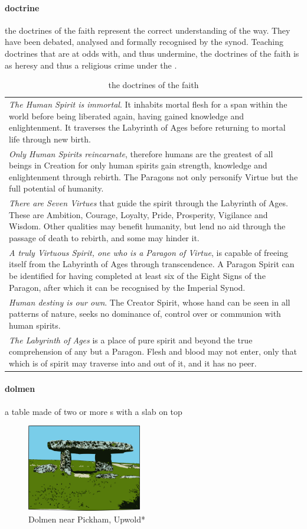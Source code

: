 \paragraph{doctrine} the doctrines of the faith represent the correct understanding of the way. They have been debated, analysed and formally recognised by the synod. Teaching doctrines that are at odds with, and thus undermine, the doctrines of the faith is as heresy and thus a religious crime under the .\begin{table} \begin{tabular}{p{}}\emph{The Human Spirit is immortal}. It inhabits mortal flesh for a span within the world before being liberated again, having gained knowledge and enlightenment. It traverses the Labyrinth of Ages before returning to mortal life through new birth.\\ \emph{Only Human Spirits reincarnate}, therefore humans are the greatest of all beings in Creation for only human spirits gain strength, knowledge and enlightenment through rebirth. The Paragons not only personify Virtue but the full potential of humanity.\\\emph{There are Seven Virtues} that guide the spirit through the Labyrinth of Ages. These are Ambition, Courage, Loyalty, Pride, Prosperity, Vigilance and Wisdom. Other qualities may benefit humanity, but lend no aid through the passage of death to rebirth, and some may hinder it.\\\emph{A truly Virtuous Spirit, one who is a Paragon of Virtue}, is capable of freeing itself from the Labyrinth of Ages through transcendence. A Paragon Spirit can be identified for having completed at least six of the Eight Signs of the Paragon, after which it can be recognised by the Imperial Synod.\\\emph{Human destiny is our own}. The Creator Spirit, whose hand can be seen in all patterns of nature, seeks no dominance of, control over or communion with human spirits.\\\emph{The Labyrinth of Ages} is a place of pure spirit and beyond the true comprehension of any but a Paragon. Flesh and blood may not enter, only that which is of spirit may traverse into and out of it, and it has no peer.\end{tabular}\caption{the doctrines of the faith}\end{table}
\paragraph{dolmen} a table made of two or more s with a slab on top \begin{figure}\centering\includegraphics[width=5cm]{encyclopedia/dolmen}\caption[Dolmen*]{Dolmen near Pickham, Upwold*}\end{figure}
